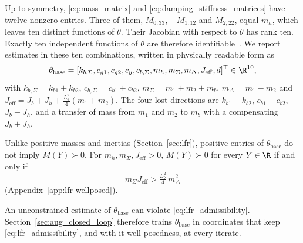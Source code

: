 Up to symmetry, \eqref{eq:mass_matrix} and \eqref{eq:damping_stiffness_matrices}
have twelve nonzero entries.
Three of them, $M_{0,33}$, $-M_{1,12}$ and $M_{2,22}$, equal $m_h$, which
leaves ten distinct functions of $\theta$.
Their Jacobian with respect to $\theta$ has rank ten.
Exactly ten independent functions of $\theta$ are therefore
identifiable~\cite[Def.~7]{ovchinnikov2021computing}.
We report estimates in these ten combinations, written in physically
readable form as
\begin{equation}
  \theta_{\mathrm{base}}=[k_{b,\Sigma},c_{g1},c_{g2},c_y,c_{b,\Sigma},
  m_h,m_\Sigma,m_\Delta,J_{\mathrm{eff}},d]^\top\in\R^{10},
  \label{eq:phi}
\end{equation}
with $k_{b,\Sigma}=k_{b1}+k_{b2}$, $c_{b,\Sigma}=c_{b1}+c_{b2}$,
$m_\Sigma=m_1+m_2+m_b$, $m_\Delta=m_1-m_2$ and
$J_{\mathrm{eff}}=J_b+J_h+\tfrac{L_b^2}{4}(m_1+m_2)$.
The four lost directions are $k_{b1}-k_{b2}$, $c_{b1}-c_{b2}$, $J_b-J_h$, and
a transfer of mass from $m_1$ and $m_2$ to $m_b$ with a compensating
$J_b+J_h$.

Unlike positive masses and inertias (Section~\ref{sec:lfr}), positive
entries of $\theta_{\mathrm{base}}$ do not imply $M(Y)\succ0$.
For $m_h,m_\Sigma,J_{\mathrm{eff}}>0$, $M(Y)\succ0$ for every $Y\in\R$ if
and only if
\begin{equation}
  m_\Sigma J_{\mathrm{eff}}>\tfrac{L_b^2}{4}\,m_\Delta^2
  \label{eq:lfr_admissibility}
\end{equation}
(Appendix~\ref{app:lfr-wellposed}).

An unconstrained estimate of $\theta_{\mathrm{base}}$ can violate
\eqref{eq:lfr_admissibility}.
Section~\ref{sec:aug_closed_loop} therefore trains $\theta_{\mathrm{base}}$
in coordinates that keep \eqref{eq:lfr_admissibility}, and with it
well-posedness, at every iterate.
